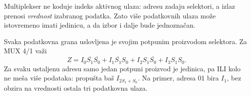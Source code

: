 
Multiplekser ne koduje indeks aktivnog ulaza: adresu zadaju selektori, a izlaz prenosi \emph{vrednost} izabranog podatka. Zato više podatkovnih ulaza može istovremeno imati jedinicu, a da izbor i dalje bude jednoznačan.

Svaka podatkovna grana uslovljena je svojim potpunim proizvodom selektora. Za MUX 4/1 važi
\[
 Z=I_0\overline{S_1}\overline{S_0}
  +I_1\overline{S_1}S_0
  +I_2S_1\overline{S_0}+I_3S_1S_0.
\]
Za svaku ustaljenu adresu samo jedan potpuni proizvod je jedinica, pa ILI kolo ne meša više podataka: propušta baš \(I_{2S_1+S_0}\). Na primer, adresa 01 bira \(I_1\), bez obzira na vrednosti ostala tri podatkovna ulaza.
